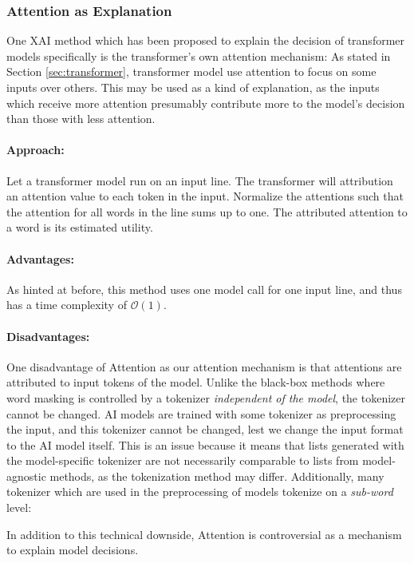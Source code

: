 \subsubsection{Attention as Explanation}
One XAI method which has been proposed to explain the decision of transformer models specifically is the transformer's own attention mechanism:
As stated in Section \ref{sec:transformer}, transformer model use attention to focus on some inputs over others.
This may be used as a kind of explanation, as the inputs which receive more attention presumably contribute more to the model's decision than those with less attention.

\paragraph{Approach:}
Let a transformer model run on an input line.
The transformer will attribution an attention value to each token in the input.
Normalize the attentions such that the attention for all words in the line sums up to one.
The attributed attention to a word is its estimated utility.

\paragraph{Advantages:}
As hinted at before, this method uses one model call for one input line, and thus has a time complexity of $\mathcal{O}(1)$.


\paragraph{Disadvantages:}
One disadvantage of Attention as our attention mechanism is that attentions are attributed to input tokens of the model.
Unlike the black-box methods where word masking is controlled by a tokenizer \textit{independent of the model}, the tokenizer cannot be changed.
AI models are trained with some tokenizer as preprocessing the input, and this tokenizer cannot be changed, lest we change the input format to the AI model itself.
This is an issue because it means that lists generated with the model-specific tokenizer are not necessarily comparable to lists from model-agnostic methods, as the tokenization method may differ.
Additionally, many tokenizer which are used in the preprocessing of models tokenize on a \textit{sub-word} level:

In addition to this technical downside, Attention is controversial as a mechanism to explain model decisions.

